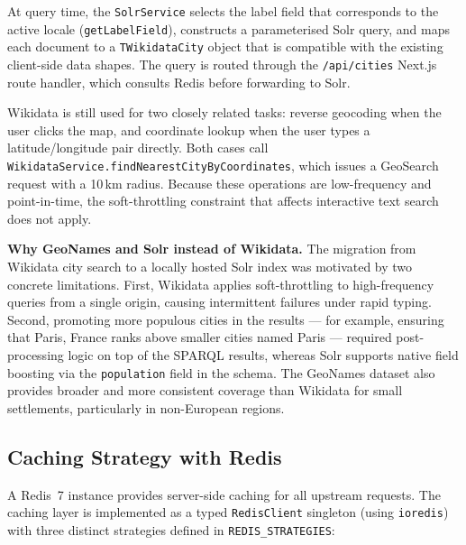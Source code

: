 At query time, the \texttt{SolrService} selects the label field that
corresponds to the active locale (\texttt{getLabelField}), constructs a
parameterised Solr query, and maps each document to a \texttt{TWikidataCity}
object that is compatible with the existing client-side data shapes. The query
is routed through the \texttt{/api/cities} Next.js route handler, which
consults Redis before forwarding to Solr.

Wikidata is still used for two closely related tasks: reverse geocoding when
the user clicks the map, and coordinate lookup when the user types a
latitude/longitude pair directly. Both cases call
\texttt{WikidataService.findNearestCityByCoordinates}, which issues a
GeoSearch request with a 10\,km radius. Because these operations are
low-frequency and point-in-time, the soft-throttling constraint that affects
interactive text search does not apply.

\textbf{Why GeoNames and Solr instead of Wikidata.} The migration from
Wikidata city search to a locally hosted Solr index was motivated by two
concrete limitations. First, Wikidata applies soft-throttling to high-frequency
queries from a single origin, causing intermittent failures under rapid typing.
Second, promoting more populous cities in the results --- for example, ensuring
that Paris, France ranks above smaller cities named Paris --- required
post-processing logic on top of the SPARQL results, whereas Solr supports
native field boosting via the \texttt{population} field in the schema.
The GeoNames dataset also provides broader and more consistent coverage than
Wikidata for small settlements, particularly in non-European regions.

\subsection{Caching Strategy with Redis}\label{APP_ARCH_REDIS}

A Redis~7 instance provides server-side caching for all upstream requests.
The caching layer is implemented as a typed \texttt{RedisClient} singleton 
(using \texttt{ioredis}) with three distinct strategies defined in 
\texttt{REDIS\_STRATEGIES}:

